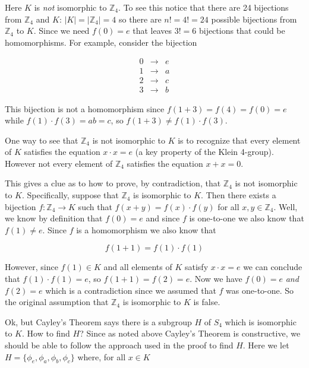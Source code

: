 \documentclass[11pt, oneside]{article}   	%
\theoremstyle{definition}
\begin{document}
\bigskip
\noindent
Here $K$ is \emph{not} isomorphic to $\mathbb{Z}_{4}$. To see this notice that there are 24 bijections from $\mathbb{Z}_4$ and $K$:
$|K| = |\mathbb{Z}_4|  = 4$ so  there are $n! = 4! = 24$ possible bijections from $\mathbb{Z}_4$ to $K$. Since we need 
$f(0) = e$ that leaves $3! = 6$  bijections that could be homomorphisms.  For example, consider the bijection

\begin{equation*}
\begin{array}{ccr}
0 &\longrightarrow&  e \\
1 &\longrightarrow&  a \\
2 &\longrightarrow&  c \\
3 &\longrightarrow&  b 
\end{array}
\end{equation*}

\bigskip
\noindent
This bijection is not a homomorphism since $f(1+3) = f(4) = f(0) = e$ while $f(1) \cdot f(3) = ab = c$, so $f(1+3) \neq f(1) \cdot f(3)$. 

\bigskip
\noindent
One way to see that $\mathbb{Z}_4$ is not isomorphic to $K$ is to recognize that every element of $K$ satisfies the equation $x \cdot x =e$  
(a key property of the Klein 4-group). However not every element of $\mathbb{Z}_4$ satisfies the equation $x + x = 0$. 

\bigskip
\noindent
This gives a clue as to how to prove,  by contradiction,   that $\mathbb{Z}_4$ is not isomorphic to $K$. Specifically,
suppose that $\mathbb{Z}_4$ is isomorphic to $K$. Then there exists a bijection 
$f: \mathbb{Z}_4 \rightarrow K$ such that $f(x + y) = f(x) \cdot f(y)$ for all $x,y \in \mathbb{Z}_4$. Well,
we know by definition that $f(0) = e$ and since $f$ is one-to-one we also know that $f(1) \neq e$. Since 
$f$ is a homomorphism we also know that

\begin{equation*}
f(1+1) = f(1) \cdot f(1)
\end{equation*}


\bigskip
\noindent
However, since $f(1) \in K$ and all elements of $K$ satisfy $x \cdot x = e$ we can conclude that $f(1) \cdot f(1) = e$, so $f(1+1) = f(2) = e$. Now we
have $f(0) = e$ \emph{and}  $f(2) = e$ which is a contradiction since we assumed that  $f$ was one-to-one. So the original assumption that 
$\mathbb{Z}_4$ is isomorphic to $K$ is false.

\bigskip
\noindent
Ok, but Cayley's Theorem says there is a subgroup $H$ of $S_4$ which is isomorphic to $K$. How to find $H$? Since as noted above Cayley's Theorem is constructive,
we should be able to follow the approach used in the proof to find $H$. Here we let $H =\{\phi_{e}, \phi_{a}, \phi_{b}, \phi_{c}\}$ where, for all $x \in K$
\end{document}
